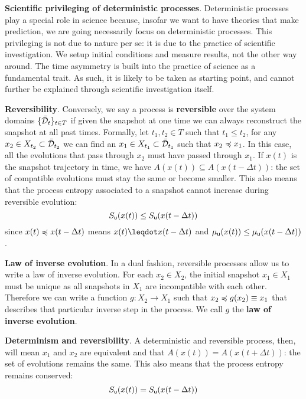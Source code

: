 \documentclass[10pt, onecolumn, longbibliography, nofootinbib]{revtex4-2}
\begin{document}
\textbf{Scientific privileging of deterministic processes}. Deterministic processes play a special role in science because, insofar we want to have theories that make prediction, we are going necessarily focus on deterministic processes. This privileging is not due to nature per se: it is due to the practice of scientific investigation. We setup initial conditions and measure results, not the other way around. The time asymmetry is built into the practice of science as a fundamental trait. As such, it is likely to be taken as starting point, and cannot further be explained through scientific investigation itself.

\textbf{Reversibility}. Conversely, we say a process is \textbf{reversible} over the system domains $\{\tdomain_t\}_{t \in T}$ if given the snapshot at one time we can always reconstruct the snapshot at all past times. Formally, let $t_1, t_2 \in T$ such that $t_1 \leq t_2$, for any $x_2 \in X_{t_2} \subset \tdomain_{t_2}$ we can find an $x_1 \in X_{t_1} \subset \tdomain_{t_1}$ such that $x_2 \narrower x_1$. In this case, all the evolutions that pass through $x_2$ must have passed through $x_1$. If $x(t)$ is the snapshot trajectory in time, we have $A(x(t)) \subseteq A(x(t - \Delta t))$: the set of compatible evolutions must stay the same or become smaller.  This also means that the process entropy associated to a snapshot cannot increase during reversible evolution:
\begin{equation}\label{entropy_reversibility}
	S_{\stmt[u]}(x(t)) \leq S_{\stmt[u]}(x(t - \Delta t))
\end{equation}
since $x(t)\narrower x(t-\Delta t)$ means $x(t) \finer x(t-\Delta t)$ and $\mu_{\stmt[u]}(x(t)) \leq \mu_{\stmt[u]}(x(t-\Delta t))$.

\textbf{Law of inverse evolution}. In a dual fashion, reversible processes allow us to write a law of inverse evolution. For each $x_2 \in X_2$, the initial snapshot $x_1 \in X_1$ must be unique as all snapshots in $X_1$ are incompatible with each other. Therefore we can write a function $g : X_2 \to X_1$ such that $x_2 \narrower g(x_2) \equiv x_1$ that describes that particular inverse step in the process. We call $g$ the \textbf{law of inverse evolution}.

\textbf{Determinism and reversibility}. A deterministic and reversible process, then, will mean $x_1$ and $x_2$ are equivalent and that  $A(x(t)) = A(x(t + \Delta t))$: the set of evolutions remains the same. This also means that the process entropy remains conserved:
\begin{equation}\label{entropy_detrev}
	S_{\stmt[u]}(x(t)) = S_{\stmt[u]}(x(t - \Delta t))
\end{equation}
\end{document}
